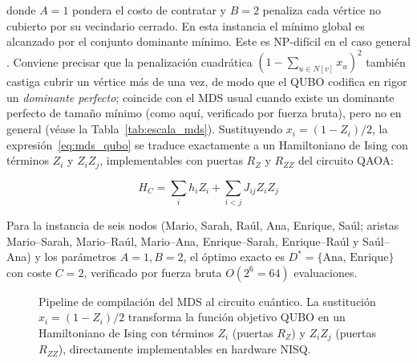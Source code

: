 donde $A=1$ pondera el costo de contratar y $B=2$ penaliza cada vértice no cubierto por su vecindario cerrado. En esta instancia el mínimo global es alcanzado por el conjunto dominante mínimo. Este es NP-difícil en el caso general \citep{garey1979}. Conviene precisar que la penalización cuadrática $(1-\sum_{u\in N[v]}x_u)^2$ también castiga cubrir un vértice más de una vez, de modo que el QUBO codifica en rigor un \emph{dominante perfecto}; coincide con el MDS usual cuando existe un dominante perfecto de tamaño mínimo (como aquí, verificado por fuerza bruta), pero no en general (véase la Tabla~\ref{tab:escala_mds}). Sustituyendo $x_i = (1 - Z_i)/2$, la expresión~\eqref{eq:mds_qubo} se traduce exactamente a un Hamiltoniano de Ising con términos $Z_i$ y $Z_iZ_j$, implementables con puertas $R_Z$ y $R_{ZZ}$ del circuito QAOA:

\begin{equation}
  H_C = \sum_i h_i Z_i + \sum_{i<j} J_{ij} Z_i Z_j
\end{equation}

Para la instancia de seis nodos (Mario, Sarah, Raúl, Ana, Enrique, Saúl; aristas Mario--Sarah, Mario--Raúl, Mario--Ana, Enrique--Sarah, Enrique--Raúl y Saúl--Ana) y los parámetros $A=1, B=2$, el óptimo exacto es $D^* = \{\text{Ana, Enrique}\}$ con coste $C=2$, verificado por fuerza bruta $O(2^6 = 64)$ evaluaciones.

\begin{figure}[!htbp]
\centering
{}
\caption{Pipeline de compilación del MDS al circuito cuántico. La sustitución $x_i=(1-Z_i)/2$ transforma la función objetivo QUBO en un Hamiltoniano de Ising con términos $Z_i$ (puertas $R_Z$) y $Z_iZ_j$ (puertas $R_{ZZ}$), directamente implementables en hardware NISQ.}
\label{fig:pipeline_qubo_ising}
\end{figure}

